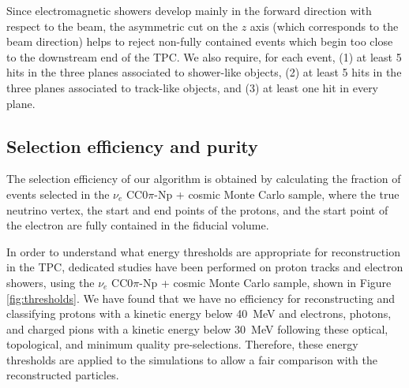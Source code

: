 Since electromagnetic showers develop mainly in the forward direction with respect to the beam, the asymmetric cut on the $z$ axis (which corresponds to the beam direction) helps to reject non-fully contained events which begin too close to the downstream end of the TPC.
We also require, for each event, (1) at least 5 hits in the three planes associated to shower-like objects, (2) at least 5 hits in the three planes associated to track-like objects, and (3) at least one hit in every plane.


\subsection{Selection efficiency and purity}\label{sec:eff}
The selection efficiency of our algorithm is obtained by calculating the fraction of events selected in the $\nu_{e}$ CC$0\pi$-Np + cosmic Monte Carlo sample, where the true neutrino vertex, the start and end points of the protons, and the start point of the electron are fully contained in the fiducial volume.

In order to understand what energy thresholds are appropriate for reconstruction in the TPC, dedicated studies have been performed on proton tracks and electron showers, using the $\nu_{e}$ CC$0\pi$-Np + cosmic Monte Carlo sample, shown in Figure \ref{fig:thresholds}. We have found that we have no efficiency for reconstructing and classifying protons {with a kinetic energy} below 40~MeV and electrons{, photons, and charged pions} {with a kinetic energy} below 30~MeV following these optical, topological, and minimum quality pre-selections. Therefore, these energy thresholds are applied to the simulations to allow a fair comparison with the reconstructed particles. 


